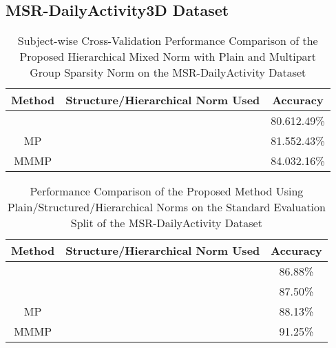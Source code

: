 \documentclass[9pt,technote,compsoc]{IEEEtran}
\begin{document}
\subsection{MSR-DailyActivity3D Dataset}

\begin{table}[!t]
	\renewcommand{\arraystretch}{1.3}
	\caption{Subject-wise Cross-Validation Performance Comparison of the Proposed Hierarchical Mixed Norm with Plain and Multipart Group Sparsity Norm on the MSR-DailyActivity Dataset}
	\label{table_msrdailyactivitynorms}
	\centering
	\begin{tabular}{|c||c||c|}
		\hline
		\bfseries Method & \bfseries Structure/Hierarchical Norm Used & \bfseries Accuracy \\\hline
		\hline
		 &  & 80.612.49\%\\\hline
		MP &  & 81.552.43\%\\\hline
		MMMP &  & 84.032.16\%\\\hline
	\end{tabular}
\end{table}

\begin{table}[!t]
	\renewcommand{\arraystretch}{1.3}
	\caption{Performance Comparison of the Proposed Method Using Plain/Structured/Hierarchical Norms on the Standard Evaluation Split of the MSR-DailyActivity Dataset}
	\label{table_msrdailyactivitysettings}
	\centering
	\begin{tabular}{|c||c||c|}
		\hline
		\bfseries Method & \bfseries Structure/Hierarchical Norm Used & \bfseries Accuracy \\\hline
		\hline
		 &  & 86.88\%\\\hline
		 &  & 87.50\%\\\hline
		MP &  & 88.13\%\\\hline
		MMMP &  & 91.25\%\\\hline
	\end{tabular}
\end{table}
\end{document}
